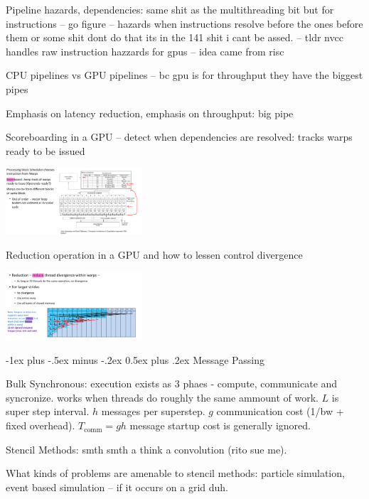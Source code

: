 \documentclass[letter,8pt,landscape]{article}
\makeatletter
\renewcommand{\section}{\@startsection{section}{1}{0mm}%
                                {-1ex plus -.5ex minus -.2ex}%
                                {0.5ex plus .2ex}%
                                {\normalfont\large\bfseries}}
\makeatother
\begin{document}
\begin{multicols}{3}
  Pipeline hazards, dependencies: same shit as the multithreading bit but for
  instructions -- go figure -- hazards when instructions resolve before the ones
  before them or some shit dont do that its in the 141 shit i cant be assed. --
  tldr nvcc handles raw instruction hazzards for gpus -- idea came from risc

  CPU pipelines vs GPU pipelines -- bc gpu is for throughput they have the
  biggest pipes

  Emphasis on latency reduction, emphasis on throughput: big pipe

  Scoreboarding in a GPU – detect when dependencies are resolved: tracks warps
  ready to be issued
  \begin{center}
    \includegraphics[width=2in]{images/scoreboard.jpg}
  \end{center}



  Reduction operation in a GPU and how to lessen control divergence
  \begin{center}
    \includegraphics[width=2in]{images/gpu-reduce.jpg}
  \end{center}

  \section{Message Passing}

  Bulk Synchronous: execution exists as 3 phaes - compute, communicate and
  syncronize. works when threads do roughly the same ammount of work. $L$ is
  super step interval. $h$ messages per superstep. $g$ communication cost (1/bw
  + fixed overhead). $T_\text{comm} = gh$ message startup cost is generally
  ignored.

  Stencil Methods: smth smth a think a convolution (rito sue me).

  What kinds of problems are amenable to stencil methods: particle simulation,
  event based simulation -- if it occurs on a grid duh.


\end{multicols}
\end{document}
